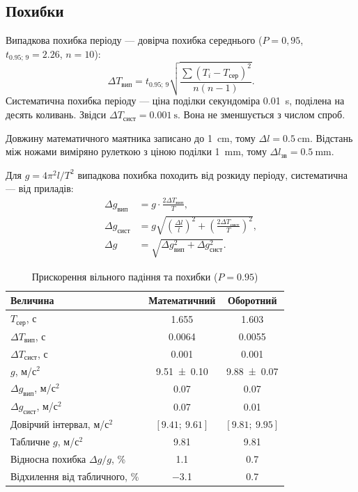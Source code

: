 \documentclass[ukrainian]{ucaphyslab}
\begin{document}
\subsection{Похибки}
Випадкова похибка періоду — довірча похибка середнього (\(P = 0{,}95\), \(t_{0.95;\,9} = 2.26\), \(n = 10\)):
\begin{equation*}
  \Delta T_\text{вип} = t_{0.95;\,9}\sqrt{\frac{\sum(T_i - T_\text{сер})^{2}}{n(n-1)}}.
\end{equation*}
Систематична похибка періоду — ціна поділки секундоміра \SI{0.01}{\second}, поділена на десять коливань. Звідси \(\Delta T_\text{сист} = \SI{0.001}{\second}\). Вона не зменшується з числом спроб.

Довжину математичного маятника записано до \SI{1}{\centi\meter}, тому \(\Delta l = \SI{0.5}{\centi\meter}\). Відстань між ножами виміряно рулеткою з ціною поділки \SI{1}{\milli\meter}, тому \(\Delta l_{\text{зв}} = \SI{0.5}{\milli\meter}\).

Для \(g = 4\pi^{2} l/T^{2}\) випадкова похибка походить від розкиду періоду, систематична — від приладів:
\begin{align*}
  \Delta g_\text{вип} &= g\cdot\frac{2\Delta T_\text{вип}}{T}, \\
  \Delta g_\text{сист} &= g\sqrt{\left(\frac{\Delta l}{l}\right)^{2} + \left(\frac{2\Delta T_\text{сист}}{T}\right)^{2}}, \\
  \Delta g &= \sqrt{\Delta g_\text{вип}^{2} + \Delta g_\text{сист}^{2}}.
\end{align*}

\begin{table}[H]
  \centering
  \begin{tabular}{@{}lcc@{}}
    \toprule
    Величина & Математичний & Оборотний \\
    \midrule
    \(T_\text{сер}\), с & \num{1.655} & \num{1.603} \\
    \(\Delta T_\text{вип}\), с & \num{0.0064} & \num{0.0055} \\
    \(\Delta T_\text{сист}\), с & \num{0.001} & \num{0.001} \\
    \midrule
    \(g\), м/с\(^2\) & \num{9.51 \pm 0.10} & \num{9.88 \pm 0.07} \\
    \(\Delta g_\text{вип}\), м/с\(^2\) & \num{0.07} & \num{0.07} \\
    \(\Delta g_\text{сист}\), м/с\(^2\) & \num{0.07} & \num{0.01} \\
    Довірчий інтервал, м/с\(^2\) & \([9.41;\ 9.61]\) & \([9.81;\ 9.95]\) \\
    \midrule
    Табличне \(g\), м/с\(^2\) & \num{9.81} & \num{9.81} \\
    Відносна похибка \(\Delta g/g\), \% & \num{1.1} & \num{0.7} \\
    Відхилення від табличного, \% & \num{-3.1} & \num{0.7} \\
    \bottomrule
  \end{tabular}
  \caption{Прискорення вільного падіння та похибки (\(P = 0.95\))}
  \label{tab:g}
\end{table}
\end{document}
